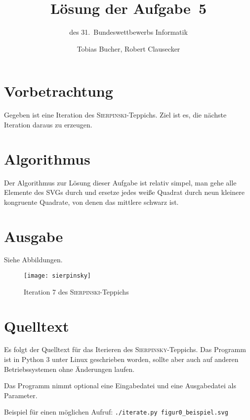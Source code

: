 \documentclass{scrartcl}
\title{Lösung der Aufgabe~5}
\subtitle{des 31.~Bundeswettbewerbs Informatik}
\author{Tobias Bucher, Robert Clausecker}
\newcommand{\src}[1]{\texttt{#1}}
\begin{document}
\maketitle

\section{Vorbetrachtung}
Gegeben ist eine Iteration des \textsc{Sierpinski}-Teppichs. Ziel ist es, die
nächste Iteration daraus zu erzeugen.

\section{Algorithmus}
Der Algorithmus zur Lösung dieser Aufgabe ist relativ simpel, man gehe alle
Elemente des SVGs durch und ersetze jedes weiße Quadrat durch neun kleinere
kongruente Quadrate, von denen das mittlere schwarz ist.

\section{Ausgabe}
Siehe Abbildungen.

\begin{figure}
	\center\texttt{[image: sierpinsky]}
	\caption{Iteration 7 des \textsc{Sierpinski}-Teppichs}
\end{figure}

\newpage\appendix
\section{Quelltext}
Es folgt der Quelltext für das Iterieren des \textsc{Sierpinsky}-Teppichs. Das
Programm ist in Python 3 unter Linux geschrieben worden, sollte aber auch auf
anderen Betriebssystemen ohne Änderungen laufen.

Das Programm nimmt optional eine Eingabedatei und eine Ausgabedatei als
Parameter.

Beispiel für einen möglichen Aufruf: \src{./iterate.py figur0\_beispiel.svg}
\end{document}
